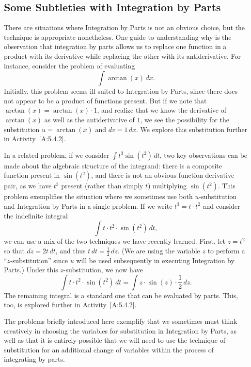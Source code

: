 

\subsection*{Some Subtleties with Integration by Parts}

There are situations where Integration by Parts is not an obvious choice, but the technique is appropriate nonetheless.  One guide to understanding why is the observation that integration by parts allows us to replace one function in a product with its derivative while replacing the other with its antiderivative.  For instance, consider the problem of evaluating 
$$\int \arctan(x) \, dx.$$
Initially, this problem seems ill-suited to Integration by Parts, since there does not appear to be a product of functions present.  But if we note that $\arctan(x) = \arctan(x) \cdot 1$, and realize that we know the derivative of $\arctan(x)$ as well as the antiderivative of $1$, we see the possibility for the substitution $u = \arctan(x)$ and $dv = 1 \, dx$.  We explore this substitution further in Activity~\ref{A:5.4.2}.

In a related problem, if we consider $\int t^3 \sin(t^2) \, dt$, two key observations can be made about the algebraic structure of the integrand:  there is a composite function present in $\sin(t^2)$, and there is not an obvious function-derivative pair, as we have $t^3$ present (rather than simply $t$) multiplying $\sin(t^2)$.  This problem exemplifies the situation where we sometimes use both $u$-substitution and Integration by Parts in a single problem.  If we write $t^3 = t \cdot t^2$ and consider the indefinite integral
$$\int t \cdot t^2 \cdot \sin(t^2) \, dt,$$
we can use a mix of the two techniques we have recently learned.  First, let $z = t^2$ so that $dz = 2t \, dt$, and thus $t \, dt = \frac{1}{2} \, dz$.  (We are using the variable $z$ to perform a ``$z$-substitution'' since $u$ will be used subsequently in executing Integration by Parts.)  Under this $z$-substitution, we now have 
$$\int t \cdot t^2 \cdot \sin(t^2) \, dt = \int z \cdot \sin(z) \cdot \frac{1}{2} \, dz.$$
The remaining integral is a standard one that can be evaluated by parts.  This, too, is explored further in Activity~\ref{A:5.4.2}.

The problems briefly introduced here exemplify that we sometimes must think creatively in choosing the variables for substitution in Integration by Parts, as well as that it is entirely possible that we will need to use the technique of substitution for an additional change of variables within the process of integrating by parts.  

